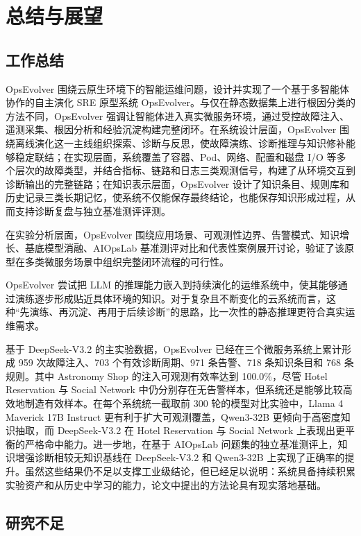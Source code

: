 \chapter{总结与展望}
\label{cha:conclusion}

\section{工作总结}
\label{sec:summary}

OpsEvolver 围绕云原生环境下的智能运维问题，设计并实现了一个基于多智能体协作的自主演化 SRE 原型系统 OpsEvolver。与仅在静态数据集上进行根因分类的方法不同，OpsEvolver 强调让智能体进入真实微服务环境，通过受控故障注入、遥测采集、根因分析和经验沉淀构建完整闭环。在系统设计层面，OpsEvolver 围绕离线演化这一主线组织探索、诊断与反思，使故障演练、诊断推理与知识修补能够稳定联结；在实现层面，系统覆盖了容器、Pod、网络、配置和磁盘 I/O 等多个层次的故障类型，并结合指标、链路和日志三类观测信号，构建了从环境交互到诊断输出的完整链路；在知识表示层面，OpsEvolver 设计了知识条目、规则库和历史记录三类长期记忆，使系统不仅能保存最终结论，也能保存知识形成过程，从而支持诊断复盘与独立基准测评评测。

在实验分析层面，OpsEvolver 围绕应用场景、可观测性边界、告警模式、知识增长、基底模型消融、AIOpsLab 基准测评对比和代表性案例展开讨论，验证了该原型在多类微服务场景中组织完整闭环流程的可行性。

OpsEvolver 尝试把 LLM 的推理能力嵌入到持续演化的运维系统中，使其能够通过演练逐步形成贴近具体环境的知识。对于复杂且不断变化的云系统而言，这种“先演练、再沉淀、再用于后续诊断”的思路，比一次性的静态推理更符合真实运维需求。

基于 DeepSeek-V3.2 的主实验数据，OpsEvolver 已经在三个微服务系统上累计形成 959 次故障注入、703 个有效诊断周期、971 条告警、718 条知识条目和 768 条规则。其中 Astronomy Shop 的注入可观测有效率达到 100.0\%，尽管 Hotel Reservation 与 Social Network 中仍分别存在无告警样本，但系统还是能够比较高效地制造有效样本。在每个系统统一截取前 300 轮的模型对比实验中，Llama 4 Maverick 17B Instruct 更有利于扩大可观测覆盖，Qwen3-32B 更倾向于高密度知识抽取，而 DeepSeek-V3.2 在 Hotel Reservation 与 Social Network 上表现出更平衡的严格命中能力。进一步地，在基于 AIOpsLab 问题集的独立基准测评上，知识增强诊断相较无知识基线在 DeepSeek-V3.2 和 Qwen3-32B 上实现了正确率的提升。虽然这些结果仍不足以支撑工业级结论，但已经足以说明：系统具备持续积累实验资产和从历史中学习的能力，论文中提出的方法论具有现实落地基础。

\section{研究不足}
\label{sec:limitations_summary}

